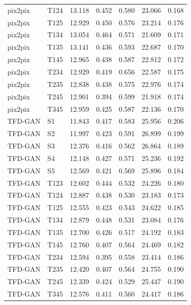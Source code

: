 \begin{longtable}{@{}llrrrrr@{}}
pix2pix & T124 & 13.118 & 0.452 & 0.580 & 23.066 & 0.168\\
pix2pix & T125 & 12.929 & 0.450 & 0.576 & 23.214 & 0.176\\
pix2pix & T134 & 13.054 & 0.464 & 0.571 & 21.609 & 0.171\\
pix2pix & T135 & 13.141 & 0.436 & 0.593 & 22.687 & 0.170\\
pix2pix & T145 & 12.965 & 0.438 & 0.587 & 22.812 & 0.172\\
pix2pix & T234 & 12.929 & 0.419 & 0.656 & 22.587 & 0.175\\
pix2pix & T235 & 12.838 & 0.438 & 0.575 & 22.976 & 0.174\\
pix2pix & T245 & 12.901 & 0.394 & 0.599 & 21.918 & 0.174\\
pix2pix & T345 & 12.959 & 0.425 & 0.587 & 22.136 & 0.170\\
TFD-GAN & S1 & 11.843 & 0.417 & 0.583 & 25.956 & 0.206\\
TFD-GAN & S2 & 11.997 & 0.423 & 0.591 & 26.899 & 0.199\\
TFD-GAN & S3 & 12.376 & 0.416 & 0.562 & 26.864 & 0.189\\
TFD-GAN & S4 & 12.148 & 0.427 & 0.571 & 25.236 & 0.192\\
TFD-GAN & S5 & 12.569 & 0.421 & 0.569 & 25.896 & 0.184\\
TFD-GAN & T123 & 12.602 & 0.444 & 0.532 & 24.226 & 0.180\\
TFD-GAN & T124 & 12.887 & 0.438 & 0.530 & 23.183 & 0.173\\
TFD-GAN & T125 & 12.555 & 0.423 & 0.543 & 24.622 & 0.185\\
TFD-GAN & T134 & 12.879 & 0.448 & 0.531 & 23.084 & 0.176\\
TFD-GAN & T135 & 12.700 & 0.426 & 0.517 & 24.192 & 0.183\\
TFD-GAN & T145 & 12.760 & 0.407 & 0.564 & 24.469 & 0.182\\
TFD-GAN & T234 & 12.594 & 0.395 & 0.558 & 23.414 & 0.186\\
TFD-GAN & T235 & 12.420 & 0.407 & 0.564 & 24.755 & 0.190\\
TFD-GAN & T245 & 12.339 & 0.424 & 0.529 & 25.447 & 0.190\\
TFD-GAN & T345 & 12.576 & 0.411 & 0.560 & 24.417 & 0.186\\
\end{longtable}
